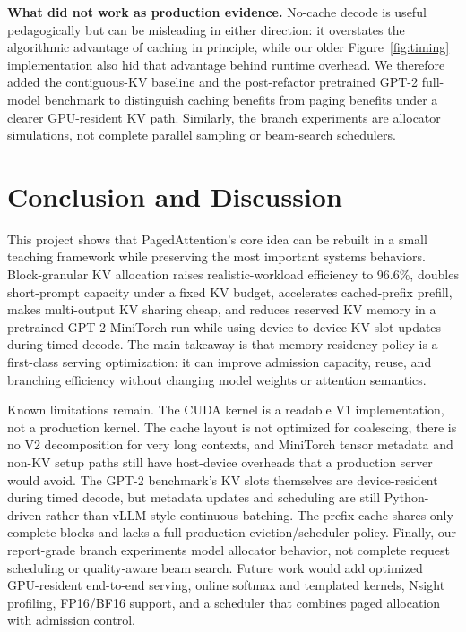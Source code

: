 \documentclass{article}
\begin{document}
\textbf{What did not work as production evidence.}  No-cache decode is useful pedagogically but can be misleading in either direction: it overstates the algorithmic advantage of caching in principle, while our older Figure~\ref{fig:timing} implementation also hid that advantage behind runtime overhead.  We therefore added the contiguous-KV baseline and the post-refactor pretrained GPT-2 full-model benchmark to distinguish caching benefits from paging benefits under a clearer GPU-resident KV path.  Similarly, the branch experiments are allocator simulations, not complete parallel sampling or beam-search schedulers.

\section{Conclusion and Discussion}

This project shows that PagedAttention's core idea can be rebuilt in a small teaching framework while preserving the most important systems behaviors.  Block-granular KV allocation raises realistic-workload efficiency to 96.6\%, doubles short-prompt capacity under a fixed KV budget, accelerates cached-prefix prefill, makes multi-output KV sharing cheap, and reduces reserved KV memory in a pretrained GPT-2 MiniTorch run while using device-to-device KV-slot updates during timed decode.  The main takeaway is that memory residency policy is a first-class serving optimization: it can improve admission capacity, reuse, and branching efficiency without changing model weights or attention semantics.

Known limitations remain.  The CUDA kernel is a readable V1 implementation, not a production kernel.  The cache layout is not optimized for coalescing, there is no V2 decomposition for very long contexts, and MiniTorch tensor metadata and non-KV setup paths still have host-device overheads that a production server would avoid.  The GPT-2 benchmark's KV slots themselves are device-resident during timed decode, but metadata updates and scheduling are still Python-driven rather than vLLM-style continuous batching.  The prefix cache shares only complete blocks and lacks a full production eviction/scheduler policy.  Finally, our report-grade branch experiments model allocator behavior, not complete request scheduling or quality-aware beam search.  Future work would add optimized GPU-resident end-to-end serving, online softmax and templated kernels, Nsight profiling, FP16/BF16 support, and a scheduler that combines paged allocation with admission control.
\end{document}
